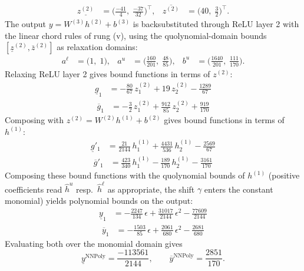 \documentclass[11pt]{article}
\begin{document}
\begin{align*}
\underline{z^{(2)}} &= \bigl(\frac{-41}{4},\; \frac{-37}{32}\bigr)^{\!\top}, & \overline{z^{(2)}} &= \bigl(40,\; \frac{3}{2}\bigr)^{\!\top}.
\end{align*}
The output $y = W^{(3)} h^{(2)} + b^{(3)}$ is backsubstituted through ReLU layer 2 with the linear chord rules of rung (v), using the quolynomial-domain bounds
$[\underline{z}^{(2)}, \overline{z}^{(2)}]$ as relaxation domains:
\begin{align*}
a^{\ell} &= \bigl(1,\; 1\bigr), & a^{u} &= \bigl(\frac{160}{201},\; \frac{48}{85}\bigr), & b^{u} &= \bigl(\frac{1640}{201},\; \frac{111}{170}\bigr).
\end{align*}
Relaxing ReLU layer 2 gives bound functions in terms of $z^{(2)}$:
\begin{align*}
\underline{g}_{1} &= -\frac{80}{67}\,z^{(2)}_{1} + 19\,z^{(2)}_{2} - \frac{1289}{67}
\end{align*}
\begin{align*}
\overline{g}_{1} &= -\frac{3}{2}\,z^{(2)}_{1} + \frac{912}{85}\,z^{(2)}_{2} + \frac{919}{170}
\end{align*}
Composing with $z^{(2)} = W^{(2)} h^{(1)} + b^{(2)}$ gives bound functions in terms of $h^{(1)}$:
\begin{align*}
\underline{g}'_{1} &= \frac{21}{2144}\,h^{(1)}_{1} + \frac{4431}{536}\,h^{(1)}_{2} - \frac{2569}{67}
\end{align*}
\begin{align*}
\overline{g}'_{1} &= \frac{423}{340}\,h^{(1)}_{1} - \frac{189}{170}\,h^{(1)}_{2} - \frac{3161}{170}
\end{align*}
Composing these bound functions with the quolynomial bounds of $h^{(1)}$ (positive
coefficients read $\hat{h}^{u}$ resp.\ $\hat{h}^{\ell}$ as appropriate, the shift $\gamma$ enters the
constant monomial) yields polynomial bounds on the output:
\begin{align*}
\underline{y}_{1} &= -\frac{2247}{134}\,\epsilon + \frac{31017}{2144}\,\epsilon^2 - \frac{77609}{2144}
\end{align*}
\begin{align*}
\overline{y}_{1} &= -\frac{1503}{85}\,\epsilon + \frac{2061}{680}\,\epsilon^2 - \frac{2681}{680}
\end{align*}
Evaluating both over the monomial domain gives
\begin{equation*}
\underline{y}^{\text{NNPoly}} = \frac{-113561}{2144}, \qquad \overline{y}^{\text{NNPoly}} = \frac{2851}{170}.
\end{equation*}
\end{document}
